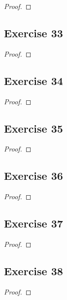 \documentclass[14pt]{extarticle}
\begin{document}
\begin{proof}

\end{proof}

\subsection{Exercise 33}

\begin{proof}

\end{proof}

\subsection{Exercise 34}

\begin{proof}

\end{proof}

\subsection{Exercise 35}

\begin{proof}

\end{proof}

\subsection{Exercise 36}

\begin{proof}

\end{proof}

\subsection{Exercise 37}

\begin{proof}

\end{proof}

\subsection{Exercise 38}

\begin{proof}

\end{proof}
\end{document}
